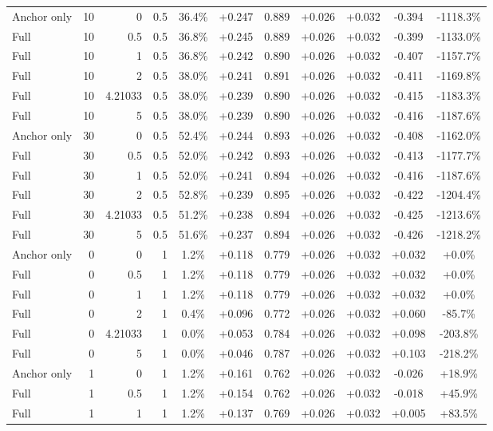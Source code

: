 \begin{table}[htbp]
\begin{tabular}{lrrrccccccc}
Anchor only & 10 & 0 & 0.5 & 36.4\% & +0.247 & 0.889 & +0.026 & +0.032 & -0.394 & -1118.3\% \\
Full & 10 & 0.5 & 0.5 & 36.8\% & +0.245 & 0.889 & +0.026 & +0.032 & -0.399 & -1133.0\% \\
Full & 10 & 1 & 0.5 & 36.8\% & +0.242 & 0.890 & +0.026 & +0.032 & -0.407 & -1157.7\% \\
Full & 10 & 2 & 0.5 & 38.0\% & +0.241 & 0.891 & +0.026 & +0.032 & -0.411 & -1169.8\% \\
Full & 10 & 4.21033 & 0.5 & 38.0\% & +0.239 & 0.890 & +0.026 & +0.032 & -0.415 & -1183.3\% \\
Full & 10 & 5 & 0.5 & 38.0\% & +0.239 & 0.890 & +0.026 & +0.032 & -0.416 & -1187.6\% \\
Anchor only & 30 & 0 & 0.5 & 52.4\% & +0.244 & 0.893 & +0.026 & +0.032 & -0.408 & -1162.0\% \\
Full & 30 & 0.5 & 0.5 & 52.0\% & +0.242 & 0.893 & +0.026 & +0.032 & -0.413 & -1177.7\% \\
Full & 30 & 1 & 0.5 & 52.0\% & +0.241 & 0.894 & +0.026 & +0.032 & -0.416 & -1187.6\% \\
Full & 30 & 2 & 0.5 & 52.8\% & +0.239 & 0.895 & +0.026 & +0.032 & -0.422 & -1204.4\% \\
Full & 30 & 4.21033 & 0.5 & 51.2\% & +0.238 & 0.894 & +0.026 & +0.032 & -0.425 & -1213.6\% \\
Full & 30 & 5 & 0.5 & 51.6\% & +0.237 & 0.894 & +0.026 & +0.032 & -0.426 & -1218.2\% \\
Anchor only & 0 & 0 & 1 & 1.2\% & +0.118 & 0.779 & +0.026 & +0.032 & +0.032 & +0.0\% \\
Full & 0 & 0.5 & 1 & 1.2\% & +0.118 & 0.779 & +0.026 & +0.032 & +0.032 & +0.0\% \\
Full & 0 & 1 & 1 & 1.2\% & +0.118 & 0.779 & +0.026 & +0.032 & +0.032 & +0.0\% \\
Full & 0 & 2 & 1 & 0.4\% & +0.096 & 0.772 & +0.026 & +0.032 & +0.060 & -85.7\% \\
Full & 0 & 4.21033 & 1 & 0.0\% & +0.053 & 0.784 & +0.026 & +0.032 & +0.098 & -203.8\% \\
Full & 0 & 5 & 1 & 0.0\% & +0.046 & 0.787 & +0.026 & +0.032 & +0.103 & -218.2\% \\
Anchor only & 1 & 0 & 1 & 1.2\% & +0.161 & 0.762 & +0.026 & +0.032 & -0.026 & +18.9\% \\
Full & 1 & 0.5 & 1 & 1.2\% & +0.154 & 0.762 & +0.026 & +0.032 & -0.018 & +45.9\% \\
Full & 1 & 1 & 1 & 1.2\% & +0.137 & 0.769 & +0.026 & +0.032 & +0.005 & +83.5\% \\

\end{tabular}
\end{table}
